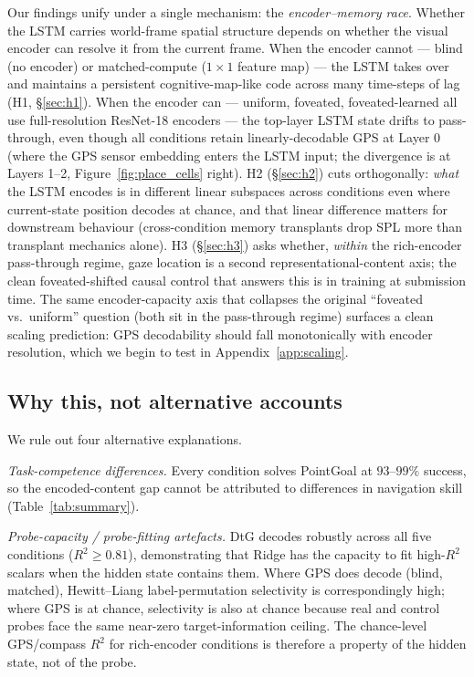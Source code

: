 \documentclass{article}
\begin{document}
Our findings unify under a single mechanism: the \emph{encoder--memory race}. Whether the LSTM carries world-frame spatial structure depends on whether the visual encoder can resolve it from the current frame. When the encoder cannot --- blind (no encoder) or matched-compute ($1{\times}1$ feature map) --- the LSTM takes over and maintains a persistent cognitive-map-like code across many time-steps of lag (H1, §\ref{sec:h1}). When the encoder can --- uniform, foveated, foveated-learned all use full-resolution ResNet-18 encoders --- the top-layer LSTM state drifts to pass-through, even though all conditions retain linearly-decodable GPS at Layer 0 (where the GPS sensor embedding enters the LSTM input; the divergence is at Layers 1--2, Figure~\ref{fig:place_cells} right). H2 (§\ref{sec:h2}) cuts orthogonally: \emph{what} the LSTM encodes is in different linear subspaces across conditions even where current-state position decodes at chance, and that linear difference matters for downstream behaviour (cross-condition memory transplants drop SPL more than transplant mechanics alone). H3 (§\ref{sec:h3}) asks whether, \emph{within} the rich-encoder pass-through regime, gaze location is a second representational-content axis; the clean foveated-shifted causal control that answers this is in training at submission time. The same encoder-capacity axis that collapses the original ``foveated vs.\ uniform'' question (both sit in the pass-through regime) surfaces a clean scaling prediction: GPS decodability should fall monotonically with encoder resolution, which we begin to test in Appendix~\ref{app:scaling}.

\subsection{Why this, not alternative accounts}

We rule out four alternative explanations.

\emph{Task-competence differences.} Every condition solves PointGoal at $93$--$99\%$ success, so the encoded-content gap cannot be attributed to differences in navigation skill (Table~\ref{tab:summary}).

\emph{Probe-capacity / probe-fitting artefacts.} DtG decodes robustly across all five conditions ($R^2 \geq 0.81$), demonstrating that Ridge has the capacity to fit high-$R^2$ scalars when the hidden state contains them. Where GPS does decode (blind, matched), Hewitt--Liang label-permutation selectivity is correspondingly high; where GPS is at chance, selectivity is also at chance because real and control probes face the same near-zero target-information ceiling. The chance-level GPS/compass $R^2$ for rich-encoder conditions is therefore a property of the hidden state, not of the probe.
\end{document}
